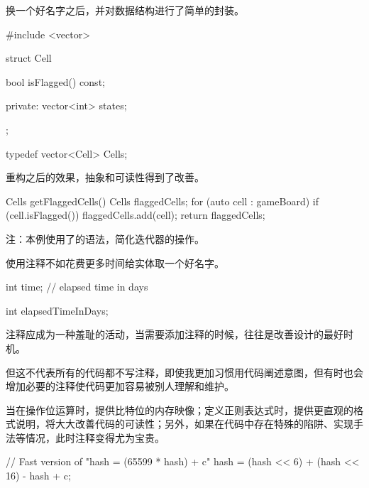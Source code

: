 \begin{content}
换一个好名字之后，并对数据结构进行了简单的封装。

\begin{leftbar}
\begin{c++}
#include <vector>

struct Cell
{
    bool isFlagged() const;

private:
    vector<int> states;
};

typedef vector<Cell> Cells;

\end{c++}
\end{leftbar}

重构之后的效果，抽象和可读性得到了改善。

\begin{leftbar}
\begin{c++}
Cells getFlaggedCells() {
    Cells flaggedCells;
    for (auto cell : gameBoard)
      if (cell.isFlagged())
        flaggedCells.add(cell);
    return flaggedCells;
}
\end{c++}
\end{leftbar}

注：本例使用了的语法，简化迭代器的操作。

\begin{regulation}
使用注释不如花费更多时间给实体取一个好名字。
\end{regulation}

\begin{leftbar}
\begin{c++}
int time; // elapsed time in days
\end{c++}
\end{leftbar}

\begin{leftbar}
\begin{c++}
int elapsedTimeInDays;
\end{c++}
\end{leftbar}

注释应成为一种羞耻的活动，当需要添加注释的时候，往往是改善设计的最好时机。

但这不代表所有的代码都不写注释，即使我更加习惯用代码阐述意图，但有时也会增加必要的注释使代码更加容易被别人理解和维护。

当在操作位运算时，提供比特位的内存映像；定义正则表达式时，提供更直观的格式说明，将大大改善代码的可读性；另外，如果在代码中存在特殊的陷阱、实现手法等情况，此时注释变得尤为宝贵。

\begin{leftbar}
\begin{c++}
// Fast version of "hash = (65599 * hash) + c"
hash = (hash << 6) + (hash << 16) - hash + c;
\end{c++}
\end{leftbar}


\end{content}
